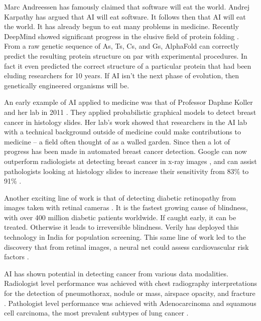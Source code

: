 Marc Andreessen has famously claimed that software will eat the world.  Andrej Karpathy has argued that AI will eat software.  It follows then that AI will eat the world.  It has already begun to eat many problems in medicine.  Recently DeepMind showed significant progress in the elusive field of protein folding \cite{senior2020improved}.  From a raw genetic sequence of As, Ts, Cs, and Gs, AlphaFold can correctly predict the resulting protein structure on par with experimental procedures.  In fact it even predicted the correct structure of a particular protein that had been eluding researchers for 10 years.  If AI isn't the next phase of evolution, then genetically engineered organisms will be.  

An early example of AI applied to medicine was that of Professor Daphne Koller and her lab in 2011 \cite{beck2011systematic}.  They applied probabilistic graphical models to detect breast cancer in histology slides.  Her lab's work showed that researchers in the AI lab with a technical background outside of medicine could make contributions to medicine -- a field often thought of as a walled garden.  Since then a lot of progress has been made in automated breast cancer detection.  Google can now outperform radiologists at detecting breast cancer in x-ray images \cite{mckinney2020international}, and can assist pathologists looking at histology slides to increase their sensitivity from 83\% to 91\% \cite{steiner2018impact}.  

Another exciting line of work is that of detecting diabetic retinopathy from images taken with retinal cameras \cite{gulshan2016development}.  It is the fastest growing cause of blindness, with over 400 million diabetic patients worldwide.  If caught early, it can be treated.  Otherwise it leads to irreversible blindness.  Verily has deployed this technology in India for population screening.  This same line of work led to the discovery that from retinal images, a neural net could assess cardiovascular risk factors \cite{poplin2018prediction}.

AI has shown potential in detecting cancer from various data modalities.   Radiologist level performance was achieved with chest radiography interpretations for the detection of pneumothorax, nodule or mass, airspace opacity, and fracture \cite{majkowska2020chest}.  Pathologist level performance was achieved with Adenocarcinoma and squamous cell carcinoma, the most prevalent subtypes of lung cancer \cite{coudray2018classification}.

